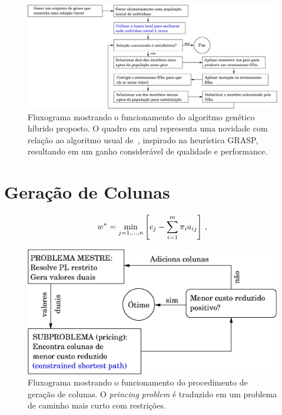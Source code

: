 \begin{figure}[htbp]
	\begin{center}
		\includegraphics[scale=0.6]{fig/genetic.eps}
		\caption{Fluxograma mostrando o funcionamento do algoritmo genético híbrido proposto. O quadro 
		em azul representa uma novidade com relação ao algoritmo usual de~\cite{beasley95,kornilakis02},
		inspirado na heurística GRASP, resultando em um ganho considerável de qualidade e performance.}
		\label{fig:genetico}
	\end{center}
\end{figure}


\section{Geração de Colunas}
\label{sec:metodos_colunas}

\begin{equation} \label{eq:sub}
	w^\ast = \min_{j = 1, \ldots, n} \left[ c_j - \sum_{i=1}^m \pi_i a_{ij} \right] \, ,
\end{equation}

\begin{figure}[htbp]
	\begin{center}
		\includegraphics[scale=0.6]{fig/cg.eps}
		\caption{Fluxograma mostrando o funcionamento do procedimento de geração de colunas.
		O {\it princing problem} é traduzido em um problema de caminho mais curto com restrições.}
		\label{fig:cg}
	\end{center}
\end{figure}

